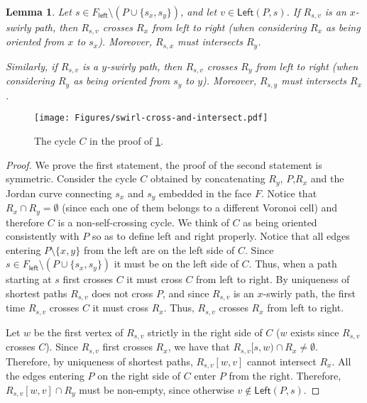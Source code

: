 \documentclass{article}
\newcommand{\Left}{\mathsf{Left}}
\newcommand{\leftside}{\mathsf{left}}
\newtheorem{lemma}{Lemma}
\begin{document}
\begin{lemma}\label{lem:swirl-cross-and-intersect}
    Let $s\in F_{\leftside}\setminus (P\cup\{s_x,s_y\})$, and let $v\in\Left(P,s)$.
    If $R_{s,v}$ is an $x$-swirly path, then $R_{s,v}$ crosses $R_x$ from left to right (when considering $R_x$ as being oriented from $x$ to $s_x$).
    Moreover, $R_{s,x}$ must intersects $R_y$.

    Similarly, if $R_{s,v}$ is a $y$-swirly path, then $R_{s,v}$ crosses $R_y$ from left to right (when considering $R_y$ as being oriented from $s_y$ to $y$).
    Moreover, $R_{s,y}$ must intersects $R_x$.
\end{lemma}
\begin{figure}[ht]
    \centering
    \texttt{[image: Figures/swirl-cross-and-intersect.pdf]}
    \caption{The cycle $C$ in the proof of \cref{lem:swirl-cross-and-intersect}.}
    \label{fig:swirl-cross-and-intersect}
\end{figure}
\begin{proof}
    We prove the first statement, the proof of the second statement is symmetric.
    Consider the cycle $C$ obtained by concatenating $R_y$, $P$,$R_x$ and the Jordan curve connecting $s_x$ and $s_y$ embedded in the face $F$.
    Notice that $R_x\cap R_y=\emptyset$ (since each one of them belongs to a different Voronoi cell) and therefore $C$ is a non-self-crossing cycle.
    We think of $C$ as being oriented consistently with $P$ so as to define left and right properly.
    Notice that all edges entering $P\setminus\{x,y\}$ from the left are on the left side of $C$.
    Since $s\in F_{\leftside}\setminus (P\cup\{s_x,s_y\})$ it must be on the left side of $C$.
    Thus, when a path starting at $s$ first crosses $C$ it must cross $C$ from left to right.
    By uniqueness of shortest paths $R_{s,v}$ does not cross $P$, and since $R_{s,v}$ is an $x$-swirly path, the first time $R_{s,v}$ crosses $C$ it must cross $R_x$.
    Thus, $R_{s,v}$ crosses $R_x$ from left to right.

    Let $w$ be the first vertex of $R_{s,v}$ strictly in the right side of $C$ ($w$ exists since $R_{s,v}$ crosses $C$).
    Since $R_{s,v}$ first crosses $R_x$, we have that $R_{s,v}[s,w)\cap R_x\ne \emptyset$.
    Therefore, by uniqueness of shortest paths, $R_{s,v}[w,v]$ cannot intersect $R_x$.
    All the edges entering $P$ on the right side of $C$ enter $P$ from the right.
    Therefore, $R_{s,v}[w,v]\cap R_y$ must be non-empty, since otherwise $v\notin \Left(P,s)$.
\end{proof}
\end{document}
